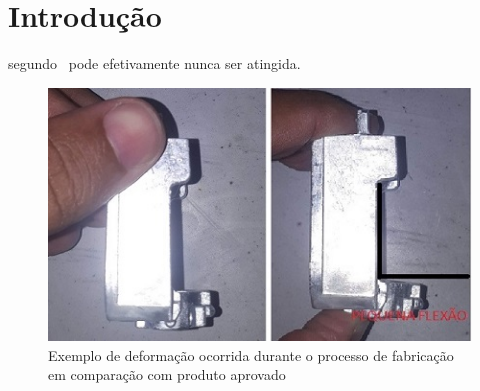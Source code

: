 

\chapter{Introdução}
\label{cap_introducao}

segundo~\cite{garvin} pode efetivamente nunca ser atingida.

\begin{figure}
    \centering
    \includegraphics{Textuais/Images/garfo.jpg}
    \caption{Exemplo de deformação ocorrida durante o processo de fabricação em comparação com produto aprovado}
    \label{fig:my_label}
\end{figure}



